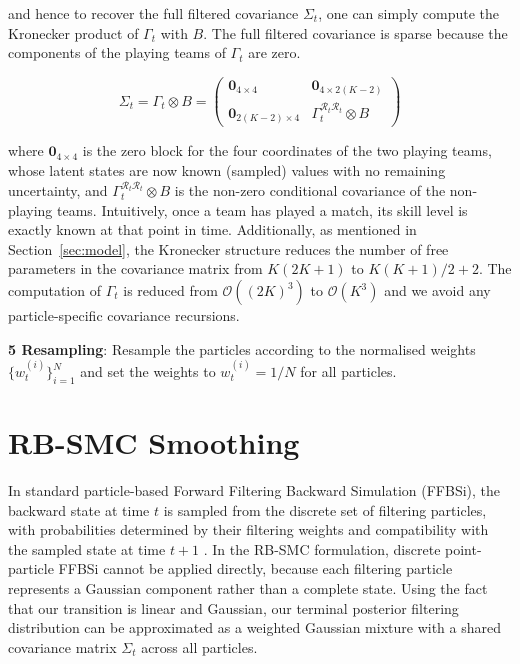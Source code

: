 and hence to recover the full filtered covariance $\Sigma_t$, one can simply compute the Kronecker product of $\Gamma_t$ with $B$. The full filtered covariance is sparse because the components of the playing teams of $\Gamma_t$ are zero.


\begin{equation*}
    \Sigma_t = \Gamma_t \otimes B = 
    \begin{pmatrix}
        \mathbf{0}_{4 \times 4} & \mathbf{0}_{4 \times 2(K-2)} \\
        \mathbf{0}_{2(K-2) \times 4} & \Gamma_t^{\mathcal{R}_t\mathcal{R}_t} \otimes B
    \end{pmatrix}
\end{equation*}

where $\mathbf{0}_{4 \times 4}$ is the zero block for the four coordinates of the two playing teams, whose latent states are now known (sampled) values with no remaining uncertainty, and $\Gamma_t^{\mathcal{R}_t\mathcal{R}_t} \otimes B$ is the non-zero conditional covariance of the non-playing teams. Intuitively, once a team has played a match, its skill level is exactly known at that point in time. Additionally, as mentioned in Section~\ref{sec:model}, the Kronecker structure reduces the number of free parameters in the covariance matrix from $K(2K+1)$ to $K(K+1)/2 + 2$. The computation of $\Gamma_t$ is reduced from $\mathcal{O}((2K)^3)$ to $\mathcal{O}(K^3)$ and we avoid any particle-specific covariance recursions.

\textbf{5 Resampling}: Resample the particles according to the normalised weights $\{w_t^{(i)}\}_{i=1}^N$ and set the weights to $w_t^{(i)} = 1/N$ for all particles.

\section{RB-SMC Smoothing}
\label{sec:rb-smc-smoothing}

In standard particle-based Forward Filtering Backward Simulation (FFBSi), the backward state at time $t$ is sampled from the discrete set of filtering particles, with probabilities determined by their filtering weights and compatibility with the sampled state at time $t+1$ \citep{godsilldoucetwest2004montecarlosmoothing}. In the RB-SMC formulation, discrete point-particle FFBSi cannot be applied directly, because each filtering particle represents a Gaussian component rather than a complete state. Using the fact that our transition is linear and Gaussian, our terminal posterior filtering distribution can be approximated as a weighted Gaussian mixture with a shared covariance matrix $\Sigma_t$ across all particles.

